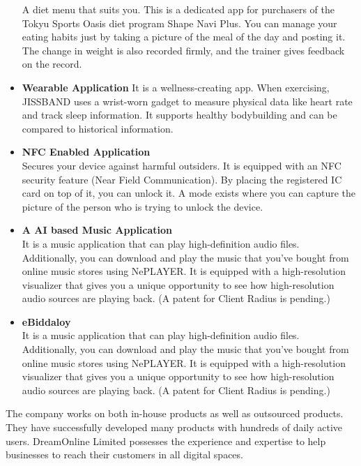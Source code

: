 \begin{flushleft}
\begin{itemize}
  \vspace{6pt}
A diet menu that suits you. This is a dedicated app for purchasers of the Tokyu Sports
Oasis diet program Shape Navi Plus. You can manage your eating habits just by taking a picture of the meal of the day and posting it. The change in weight is also recorded
firmly, and the trainer gives feedback on the record.
 \item \textbf{Wearable Application}
  \vspace{6pt}
It is a wellness-creating app. When exercising, JISSBAND uses a wrist-worn gadget to
measure physical data like heart rate and track sleep information. It supports healthy
bodybuilding and can be compared to historical information.
 \item \textbf{NFC Enabled Application}\\
  \vspace{6pt}
Secures your device against harmful outsiders. It is equipped with an NFC security
feature (Near Field Communication). By placing the registered IC card on top of it, you
can unlock it. A mode exists where you can capture the picture of the person who is
trying to unlock the device.
 \item \textbf{A AI based Music Application}\\
 \vspace{6pt}
It is a music application that can play high-definition audio files. Additionally, you can
download and play the music that you've bought from online music stores using
NePLAYER. It is equipped with a high-resolution visualizer that gives you a unique
opportunity to see how high-resolution audio sources are playing back. (A patent for
Client Radius is pending.)
\item \textbf{eBiddaloy}\\
 \vspace{6pt}
It is a music application that can play high-definition audio files. Additionally, you can
download and play the music that you've bought from online music stores using
NePLAYER. It is equipped with a high-resolution visualizer that gives you a unique
opportunity to see how high-resolution audio sources are playing back. (A patent for
Client Radius is pending.)
\end{itemize}
\vspace{8pt}
The company works on both in-house products as well as outsourced products. They have
successfully developed many products with hundreds of daily active users. DreamOnline
Limited possesses the experience and expertise to help businesses to reach their customers in
all digital spaces.

\end{flushleft}



